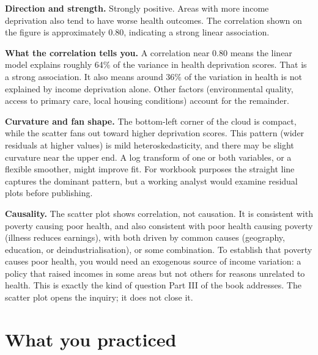 \documentclass[
  letterpaper,
  11pt,
  twoside,
  openany]{scrbook}
\begin{document}
\begin{tcolorbox}[enhanced jigsaw, arc=.35mm, bottomrule=.15mm, bottomtitle=1mm, breakable, colback=white, colbacktitle=quarto-callout-note-color!10!white, colframe=quarto-callout-note-color-frame, coltitle=black, left=2mm, leftrule=.75mm, opacityback=0, opacitybacktitle=0.6, rightrule=.15mm, title=\textcolor{quarto-callout-note-color}{\faInfo}\hspace{0.5em}{Solution to Problem 10}, titlerule=0mm, toprule=.15mm, toptitle=1mm]

\textbf{Direction and strength.} Strongly positive. Areas with more
income deprivation also tend to have worse health outcomes. The
correlation shown on the figure is approximately 0.80, indicating a
strong linear association.

\textbf{What the correlation tells you.} A correlation near 0.80 means
the linear model explains roughly 64\% of the variance in health
deprivation scores. That is a strong association. It also means around
36\% of the variation in health is not explained by income deprivation
alone. Other factors (environmental quality, access to primary care,
local housing conditions) account for the remainder.

\textbf{Curvature and fan shape.} The bottom-left corner of the cloud is
compact, while the scatter fans out toward higher deprivation scores.
This pattern (wider residuals at higher values) is mild
heteroskedasticity, and there may be slight curvature near the upper
end. A log transform of one or both variables, or a flexible smoother,
might improve fit. For workbook purposes the straight line captures the
dominant pattern, but a working analyst would examine residual plots
before publishing.

\textbf{Causality.} The scatter plot shows correlation, not causation.
It is consistent with poverty causing poor health, and also consistent
with poor health causing poverty (illness reduces earnings), with both
driven by common causes (geography, education, or deindustrialisation),
or some combination. To establish that poverty causes poor health, you
would need an exogenous source of income variation: a policy that raised
incomes in some areas but not others for reasons unrelated to health.
This is exactly the kind of question Part III of the book addresses. The
scatter plot opens the inquiry; it does not close it.

\end{tcolorbox}

\section{What you practiced}\label{what-you-practiced-1}
\end{document}
